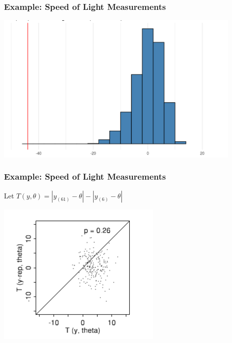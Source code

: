 \documentclass{beamer}
\begin{document}
\begin{frame}
\frametitle{Example: Speed of Light Measurements}

\begin{center}
\includegraphics[width=120mm]{mins_histogram.png}
\end{center}

\end{frame}


\begin{frame}
\frametitle{Example: Speed of Light Measurements}

Let $T(y,\theta) = |y_{(61)} - \theta| - |y_{(6)} - \theta|$

\begin{center}
\includegraphics[width=80mm]{T_scatter.png}
\end{center}

\end{frame}
\end{document}
